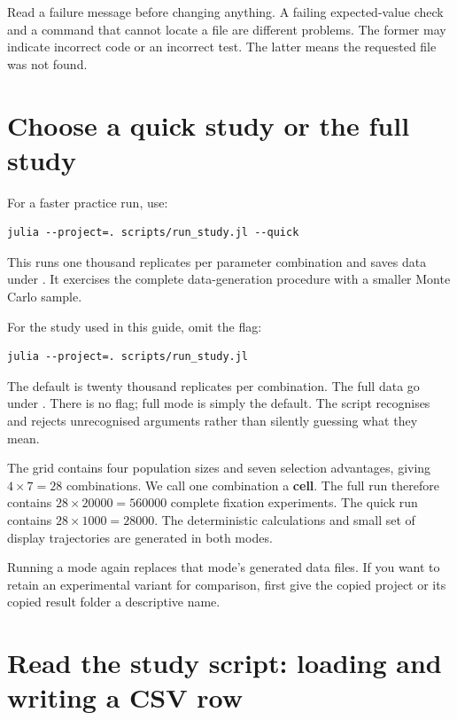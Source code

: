 Read a failure message before changing anything. A failing expected-value
check and a command that cannot locate a file are different problems. The
former may indicate incorrect code or an incorrect test. The latter means
the requested file was not found.

\section{Choose a quick study or the full study}

For a faster practice run, use:
\begin{lstlisting}[language={},numbers=none]
julia --project=. scripts/run_study.jl --quick
\end{lstlisting}
This runs one thousand replicates per parameter combination and saves data
under . It exercises the complete data-generation
procedure with a smaller Monte Carlo sample.

For the study used in this guide, omit the flag:
\begin{lstlisting}[language={},numbers=none]
julia --project=. scripts/run_study.jl
\end{lstlisting}
The default is twenty thousand replicates per combination. The full data
go under . There is no  flag; full mode
is simply the default. The script recognises  and rejects
unrecognised arguments rather than silently guessing what they mean.

The grid contains four population sizes and seven selection advantages,
giving \(4\times7=28\) combinations. We call one combination a
\textbf{cell}. The full run therefore contains \(28\times20000=560000\)
complete fixation experiments. The quick run contains
\(28\times1000=28000\). The deterministic calculations and small set of
display trajectories are generated in both modes.

Running a mode again replaces that mode's generated data files. If you want
to retain an experimental variant for comparison, first give the copied
project or its copied result folder a descriptive name.

\section{Read the study script: loading and writing a CSV row}



